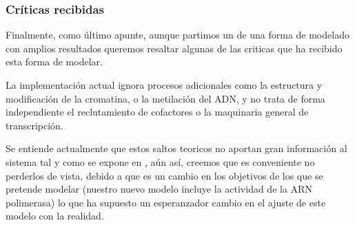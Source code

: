  
 
 
 \subsubsection{Críticas recibidas}
 
 
 Finalmente, como último apunte, aunque partimos un de una forma de modelado con amplios resultados queremos resaltar algunas de las criticas que ha recibido esta forma de modelar.
 
 La implementación actual ignora procesos adicionales como la estructura y modificación de la cromatina, o la metilación del ADN, y no trata de forma independiente el reclutamiento de cofactores o la maquinaria general de transcripción.
 
  Se entiende actualmente que estos saltos teoricos no aportan gran información al sistema tal y como se expone en \cite{ay2011mathematical}, aún así, creemos que es conveniente no perderlos de vista, debido a que es un cambio en los objetivos de los que se pretende modelar (nuestro nuevo modelo incluye la actividad de la ARN polimerasa) lo que ha supuesto un esperanzador cambio en el ajuste de este modelo con la realidad.